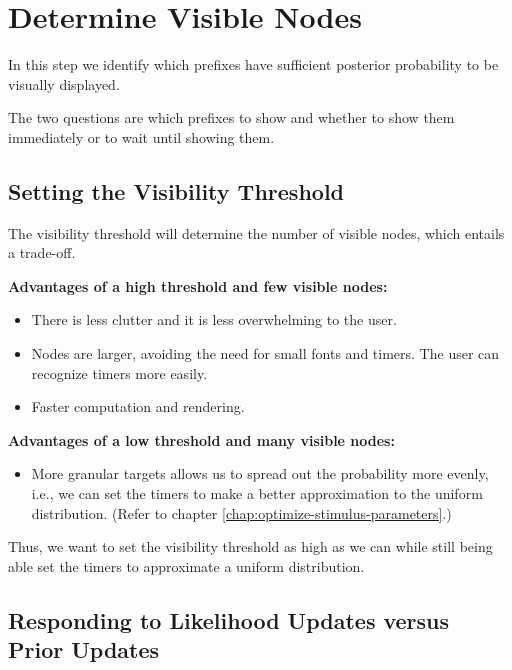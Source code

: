 \chapter{Determine Visible Nodes}
\label{chap:determine-visible-nodes}

In this step we identify which prefixes have sufficient
posterior probability to be visually displayed.

The two questions are which prefixes to show and whether
to show them immediately or to wait until showing them.

\section{Setting the Visibility Threshold}

The visibility threshold will determine the number
of visible nodes, which entails a trade-off.


\medskip\noindent\textbf{Advantages of a high threshold and few visible nodes:}
\begin{itemize}[topsep=2pt]
  \item There is less clutter and it is less overwhelming to the user.
  \item Nodes are larger, avoiding the need for small fonts and timers. The user can recognize timers more easily.
  \item Faster computation and rendering.
\end{itemize}


\medskip\noindent\textbf{Advantages of a low threshold and many visible nodes:}
\begin{itemize}[topsep=2pt]
  \item More granular targets allows us to spread out the probability
  more evenly, i.e., we can set the timers to make a better approximation to the uniform distribution.
  (Refer to chapter \ref{chap:optimize-stimulus-parameters}.)
\end{itemize}

Thus, we want to set the visibility threshold as high as we can while still
being able set the timers to approximate a uniform distribution.

\section{Responding to Likelihood Updates versus Prior Updates}

